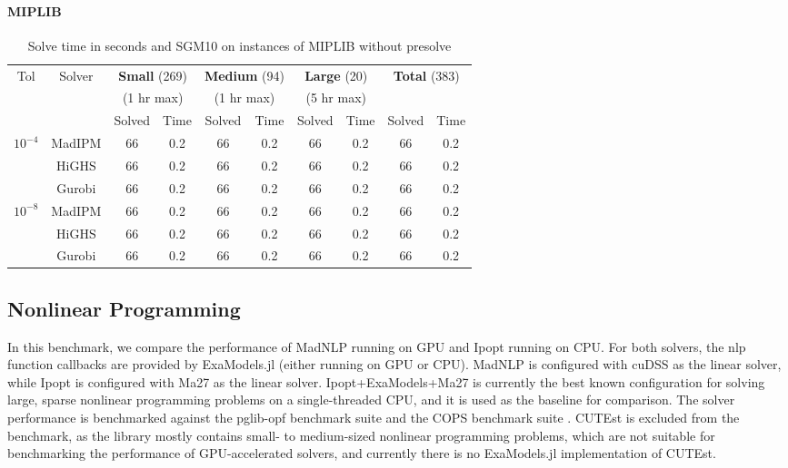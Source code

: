 \documentclass{article}
\begin{document}
\paragraph{MIPLIB}
\begin{table}[t]
  \centering\small
  \caption{Solve time in seconds and SGM10 on instances of MIPLIB without presolve}
  \begin{tabular}{|c|c|cc|cc|cc|cc|}
    \hline
    \multirow{ 3}{*}{Tol} & \multirow{ 3}{*}{Solver} & \multicolumn{2}{c|}{\textbf{Small} (269)}& \multicolumn{2}{c|}{\textbf{Medium} (94)}& \multicolumn{2}{c|}{\textbf{Large} (20)}& \multicolumn{2}{c|}{\multirow{2}{*}{\textbf{Total} (383)}}\\
                          && \multicolumn{2}{c|}{(1 hr max)}& \multicolumn{2}{c|}{(1 hr max)}& \multicolumn{2}{c|}{(5 hr max)}&&\\
                          &&  Solved & Time &  Solved & Time &  Solved & Time &  Solved & Time \\
    \hline
    \multirow{3}{*}{$10^{-4}$} & MadIPM & 66 & 0.2 & 66 & 0.2 & 66 & 0.2 & 66 & 0.2  \\
                          & HiGHS & 66 & 0.2 & 66 & 0.2 & 66 & 0.2 & 66 & 0.2 \\
                          & Gurobi & 66 & 0.2 & 66 & 0.2 & 66 & 0.2 & 66 & 0.2 \\
    \hline
    \multirow{3}{*}{$10^{-8}$} & MadIPM & 66 & 0.2 & 66 & 0.2 & 66 & 0.2& 66 & 0.2 \\
                          & HiGHS & 66 & 0.2 & 66 & 0.2 & 66 & 0.2& 66 & 0.2 \\
                          & Gurobi & 66 & 0.2 & 66 & 0.2 & 66 & 0.2& 66 & 0.2 \\
    \hline
  \end{tabular}
\end{table}

\subsection{Nonlinear Programming}
In this benchmark, we compare the performance of MadNLP running on GPU and Ipopt running on CPU. For both solvers, the \gls*{nlp} function callbacks are provided by ExaModels.jl (either running on GPU or CPU). MadNLP is configured with cuDSS as the linear solver, while Ipopt is configured with Ma27 as the linear solver. Ipopt+ExaModels+Ma27 is currently the best known configuration for solving large, sparse nonlinear programming problems on a single-threaded CPU, and it is used as the baseline for comparison. The solver performance is benchmarked against the pglib-opf benchmark suite \cite{} and the COPS benchmark suite \cite{}. CUTEst \cite{} is excluded from the benchmark, as the library mostly contains small- to medium-sized nonlinear programming problems, which are not suitable for benchmarking the performance of GPU-accelerated solvers, and currently there is no ExaModels.jl implementation of CUTEst.
\end{document}

